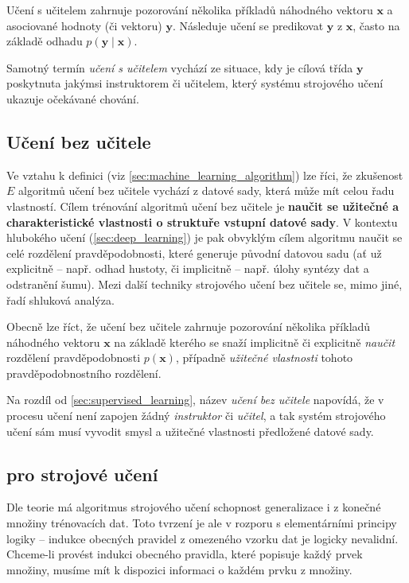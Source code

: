 Učení s učitelem zahrnuje pozorování několika příkladů náhodného vektoru $\mathbf{x}$ a asociované hodnoty (či vektoru) $\mathbf{y}$.
Následuje učení se predikovat $\mathbf{y}$ z $\mathbf{x}$, často na základě odhadu $p(\mathbf{y}\mid\mathbf{x})$.

Samotný termín \emph{učení s učitelem} vychází ze situace, kdy je cílová třída $\mathbf{y}$ poskytnuta jakýmsi instruktorem či učitelem, který systému strojového učení ukazuje očekávané chování. \cite{Goodfellow2016}
\subsection{Učení bez učitele}
Ve vztahu k definici (viz \autoref{sec:machine_learning_algorithm}) lze říci, že zkušenost $E$ algoritmů učení bez učitele vychází z datové sady, která může mít celou řadu vlastností.
Cílem trénování algoritmů učení bez učitele je \textbf{naučit se užitečné a charakteristické vlastnosti o struktuře vstupní datové sady}.
V kontextu hlubokého učení (\autoref{sec:deep_learning}) je pak obvyklým cílem algoritmu naučit se celé rozdělení pravděpodobnosti, které generuje původní datovou sadu (ať už explicitně – např. odhad hustoty, či implicitně – např. úlohy syntézy dat a odstranění šumu).
Mezi další techniky strojového učení bez učitele se, mimo jiné, řadí shluková analýza.

Obecně lze říct, že učení bez učitele zahrnuje pozorování několika příkladů náhodného vektoru $\mathbf{x}$ na základě kterého se snaží implicitně či explicitně \emph{naučit} rozdělení pravděpodobnosti $p(\mathbf{x})$, případně \emph{užitečné vlastnosti} tohoto pravděpodobnostního rozdělení.

Na rozdíl od \autoref{sec:supervised_learning}, název \emph{učení bez učitele} napovídá, že v procesu učení není zapojen žádný \emph{instruktor} či \emph{učitel}, a tak systém strojového učení sám musí vyvodit smysl a užitečné vlastnosti předložené datové sady. \cite{Goodfellow2016}
\subsection{ pro strojové učení}
\label{sec:no_free_lunch}
Dle teorie má algoritmus strojového učení schopnost generalizace i z konečné množiny trénovacích dat. 
Toto tvrzení je ale v rozporu s elementárními principy logiky – indukce obecných pravidel z omezeného vzorku dat je logicky nevalidní.
Chceme-li provést indukci obecného pravidla, které popisuje každý prvek množiny, musíme mít k dispozici informaci o každém prvku z množiny.  \cite{Goodfellow2016}

